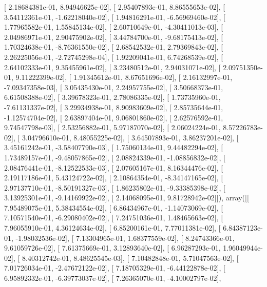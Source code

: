 \documentclass{article}
\begin{document}
       [  2.18684381e-01,   8.94946625e-02],
       [  2.95407893e-01,   8.86555653e-02],
       [  3.54112361e-01,  -1.62218040e-02],
       [  1.94816291e-01,  -6.56969460e-02],
       [  1.77965582e-01,   1.55845134e-02],
       [  2.60710649e-01,  -4.30411013e-03],
       [  2.04986971e-01,   2.90475902e-02],
       [  3.44784700e-01,  -9.68175413e-02],
       [  1.70324638e-01,  -8.76361550e-02],
       [  2.68542532e-01,   2.79369843e-02],
       [  2.26225056e-01,  -2.72745298e-04],
       [  1.92209041e-01,   6.74268539e-02],
       [  2.64102333e-01,   9.35455961e-02],
       [  3.23480512e-01,   2.94031071e-02],
       [  2.09751350e-01,   9.11222399e-02],
       [  1.91345612e-01,   8.67651696e-02],
       [  2.16132997e-01,  -7.09347358e-03],
       [  3.05435430e-01,   2.24957755e-02],
       [  3.50668373e-01,   6.61508388e-02],
       [  3.39678323e-01,   2.78086335e-02],
       [  1.73735960e-01,  -7.61131337e-02],
       [  3.29934938e-01,   8.90983609e-02],
       [  2.85735644e-01,  -1.12574704e-02],
       [  2.63897404e-01,   9.06801860e-02],
       [  2.62576592e-01,   9.74547798e-03],
       [  2.53256882e-01,   5.97187070e-02],
       [  2.06024224e-01,   8.57226783e-02],
       [  3.04796610e-01,   8.48055225e-02],
       [  3.64507893e-01,   3.86237201e-02],
       [  3.45161242e-01,  -3.58407790e-03],
       [  1.75060134e-01,   9.44482294e-02],
       [  1.73489157e-01,  -9.48057865e-02],
       [  2.08824339e-01,  -1.08856832e-02],
       [  2.08476441e-01,  -8.12522533e-03],
       [  2.07605167e-01,   8.16344476e-02],
       [  2.19117186e-01,   5.43124722e-02],
       [  2.10864354e-01,  -8.34147165e-02],
       [  2.97137710e-01,  -8.50191327e-03],
       [  1.86235802e-01,  -9.33385398e-02],
       [  3.13925301e-01,  -9.14169922e-02],
       [  2.14068095e-01,   9.81728942e-02]]), array([[  7.95489075e-01,   5.38434554e-02],
       [  6.86434967e-01,  -1.14073069e-02],
       [  7.10571540e-01,  -6.29080402e-02],
       [  7.24751036e-01,   1.48465663e-02],
       [  7.96055910e-01,   4.36124634e-02],
       [  6.85200161e-01,   7.77011381e-02],
       [  6.84387123e-01,  -1.98032536e-02],
       [  7.13304965e-01,   1.68377559e-02],
       [  8.24743366e-01,   9.61059726e-02],
       [  7.61375669e-01,   3.12893640e-02],
       [  6.96287293e-01,   1.96049944e-02],
       [  8.40312742e-01,   8.48625545e-03],
       [  7.10482848e-01,   5.71047563e-02],
       [  7.01726034e-01,  -2.47672122e-02],
       [  7.18705329e-01,  -6.44122878e-02],
       [  6.95892332e-01,  -6.39773037e-02],
       [  7.26365070e-01,  -4.10002797e-02],
\end{document}
